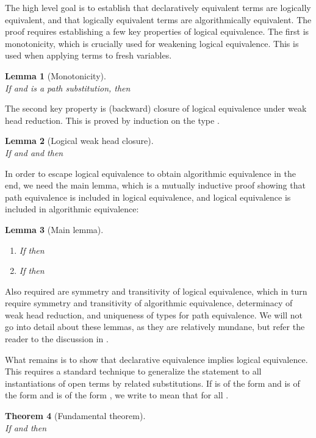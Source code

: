 \documentclass[copyright,creativecommons]{eptcs}
\newtheorem{theorem}{Theorem}[section]
\newtheorem{lemma}[theorem]{Lemma}
\begin{document}
The high level goal is to establish that declaratively equivalent
terms are logically equivalent, and that logically equivalent terms
are algorithmically equivalent. The proof requires establishing a
few key properties of logical equivalence. The first is
monotonicity, which is crucially used for weakening logical
equivalence. This is used when applying terms to fresh variables.

\begin{lemma}[Monotonicity]\\
If  and  is
a path substitution, then 
\end{lemma}

The second key property is (backward) closure of logical equivalence
under weak head reduction. This is proved by induction on the type .

\begin{lemma}[Logical weak head closure]\\
If   and 
and  then 
\end{lemma}

In order to escape logical equivalence to obtain algorithmic
equivalence in the end, we need the main lemma, which is a mutually
inductive proof showing that path equivalence is included in
logical equivalence, and logical equivalence is included in
algorithmic equivalence:

\begin{lemma}[Main lemma]
\begin{enumerate}
\item If  then 
\item If  then 
\end{enumerate}
\end{lemma}

Also required are symmetry and transitivity of logical equivalence,
which in turn require symmetry and transitivity of algorithmic
equivalence, determinacy of weak head reduction, and uniqueness of
types for path equivalence. We will not go
into detail about these lemmas, as they are relatively mundane, but refer the
reader to the discussion in \cite{Crary:ATAPL}.

What remains is to show that declarative equivalence implies logical
equivalence. This requires a standard technique to generalize the
statement to all instantiations of open terms by related substitutions. If
 is of the form  and  is of
the form  and  is of the form
, we write
 to mean that  for all .

\begin{theorem}[Fundamental theorem]\\
If   and  then 
\end{theorem}
\end{document}
